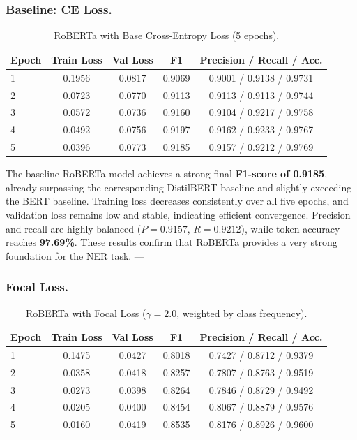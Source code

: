 \subsubsection{Baseline: CE Loss.}

\begin{table}[H]
\centering
\caption{RoBERTa with Base Cross-Entropy Loss (5 epochs).}
\begin{tabular}{lcccc}
\hline
\textbf{Epoch} & \textbf{Train Loss} & \textbf{Val Loss} & \textbf{F1} & \textbf{Precision} / \textbf{Recall} / \textbf{Acc.} \\
\hline
1 & 0.1956 & 0.0817 & 0.9069 & 0.9001 / 0.9138 / 0.9731 \\
2 & 0.0723 & 0.0770 & 0.9113 & 0.9113 / 0.9113 / 0.9744 \\
3 & 0.0572 & 0.0736 & 0.9160 & 0.9104 / 0.9217 / 0.9758 \\
4 & 0.0492 & 0.0756 & 0.9197 & 0.9162 / 0.9233 / 0.9767 \\
5 & 0.0396 & 0.0773 & 0.9185 & 0.9157 / 0.9212 / 0.9769 \\
\hline
\end{tabular}
\label{tab:roberta_base_ce}
\end{table}

The baseline RoBERTa model achieves a strong final \textbf{F1-score of 0.9185}, already surpassing the corresponding DistilBERT baseline and slightly exceeding the BERT baseline.
Training loss decreases consistently over all five epochs, and validation loss remains low and stable, indicating efficient convergence.
Precision and recall are highly balanced ($P = 0.9157$, $R = 0.9212$), while token accuracy reaches \textbf{97.69\%}.
These results confirm that RoBERTa provides a very strong foundation for the NER task.
---

\subsubsection{Focal Loss.}

\begin{table}[H]
\centering
\caption{RoBERTa with Focal Loss ($\gamma = 2.0$, weighted by class frequency).}
\begin{tabular}{lcccc}
\hline
\textbf{Epoch} & \textbf{Train Loss} & \textbf{Val Loss} & \textbf{F1} & \textbf{Precision} / \textbf{Recall} / \textbf{Acc.} \\
\hline
1 & 0.1475 & 0.0427 & 0.8018 & 0.7427 / 0.8712 / 0.9379 \\
2 & 0.0358 & 0.0418 & 0.8257 & 0.7807 / 0.8763 / 0.9519 \\
3 & 0.0273 & 0.0398 & 0.8264 & 0.7846 / 0.8729 / 0.9492 \\
4 & 0.0205 & 0.0400 & 0.8454 & 0.8067 / 0.8879 / 0.9576 \\
5 & 0.0160 & 0.0419 & 0.8535 & 0.8176 / 0.8926 / 0.9600 \\
\hline
\end{tabular}
\label{tab:roberta_focal}
\end{table}

